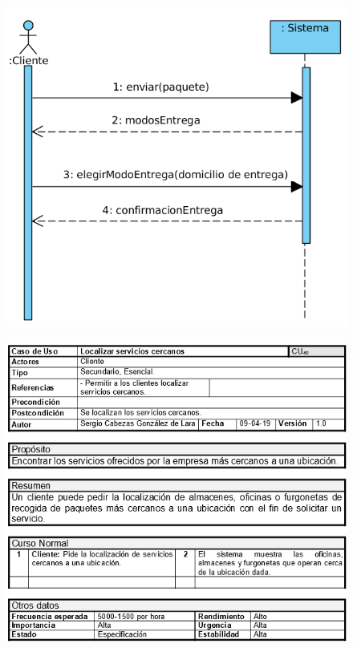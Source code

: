 \begin{figure}[H]
	\centering
	\includegraphics[width=16cm]{49}
\end{figure}
\begin{figure}[H]
	\centering
	\includegraphics[width=16cm]{50}
\end{figure}
